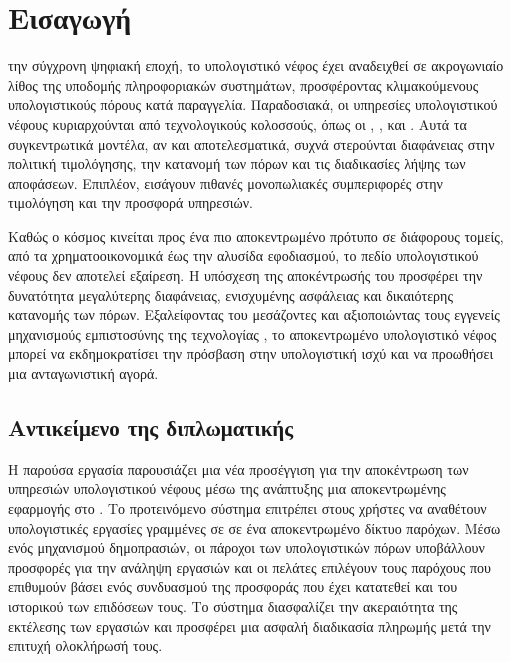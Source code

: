 \chapter{Εισαγωγή} 
την σύγχρονη ψηφιακή εποχή, το υπολογιστικό νέφος 
 έχει αναδειχθεί σε ακρογωνιαίο λίθος της υποδομής
πληροφοριακών συστημάτων, προσφέροντας κλιμακούμενους υπολογιστικούς
πόρους κατά παραγγελία. Παραδοσιακά, οι υπηρεσίες υπολογιστικού νέφους 
κυριαρχούνται από τεχνολογικούς κολοσσούς, όπως οι , ,  και 
. Αυτά τα συγκεντρωτικά μοντέλα, αν 
και αποτελεσματικά, συχνά στερούνται διαφάνειας στην πολιτική τιμολόγησης, 
την κατανομή των πόρων και τις διαδικασίες λήψης των αποφάσεων. 
Επιπλέον, εισάγουν πιθανές μονοπωλιακές  συμπεριφορές στην τιμολόγηση
και την προσφορά υπηρεσιών.
 
Καθώς ο κόσμος κινείται προς ένα πιο αποκεντρωμένο πρότυπο σε διάφορους 
τομείς, από τα χρηματοοικονομικά έως την αλυσίδα εφοδιασμού, το πεδίο 
υπολογιστικού νέφους δεν αποτελεί εξαίρεση. Η υπόσχεση της αποκέντρωσής 
του προσφέρει την δυνατότητα μεγαλύτερης διαφάνειας, ενισχυμένης ασφάλειας 
και δικαιότερης κατανομής των πόρων. Εξαλείφοντας του μεσάζοντες και 
αξιοποιώντας τους εγγενείς μηχανισμούς εμπιστοσύνης της τεχνολογίας 
, το αποκεντρωμένο υπολογιστικό νέφος μπορεί να εκδημοκρατίσει 
την πρόσβαση στην υπολογιστική ισχύ και να προωθήσει μια ανταγωνιστική 
αγορά.


\section{Αντικείμενο της διπλωματικής}
Η παρούσα εργασία παρουσιάζει μια νέα προσέγγιση για την αποκέντρωση 
των υπηρεσιών υπολογιστικού νέφους μέσω της ανάπτυξης μια αποκεντρωμένης 
εφαρμογής  στο . 
Το προτεινόμενο σύστημα επιτρέπει στους χρήστες να αναθέτουν υπολογιστικές 
εργασίες γραμμένες σε  σε ένα αποκεντρωμένο δίκτυο παρόχων. 
Μέσω ενός μηχανισμού δημοπρασιών, οι πάροχοι των υπολογιστικών πόρων 
υποβάλλουν προσφορές για την ανάληψη εργασιών και οι πελάτες επιλέγουν 
τους παρόχους που επιθυμούν βάσει ενός συνδυασμού της προσφοράς που έχει 
κατατεθεί και του ιστορικού των επιδόσεων τους. Το σύστημα διασφαλίζει την 
ακεραιότητα της εκτέλεσης των εργασιών και προσφέρει μια ασφαλή διαδικασία 
πληρωμής μετά την επιτυχή ολοκλήρωσή τους.

